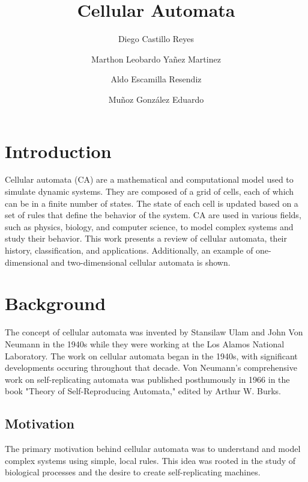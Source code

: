 \documentclass[9pt,a4paper,twoside]{tau-class/tau}
\title{Cellular Automata}
\author[a]{Diego Castillo Reyes}
\author[a]{Marthon Leobardo Yañez Martinez}
\author[a]{Aldo Escamilla Resendiz}
\author[a]{Muñoz González Eduardo}
\affil[a]{Researcher}
\begin{document}
		
    \maketitle 
    \thispagestyle{firststyle} \tauabstract
    \tableofcontents

\section{Introduction}

    Cellular automata (CA) are a mathematical and computational model used to simulate dynamic systems. 
        They are composed of a grid of cells, each of which can be in a finite number of states. 
        The state of each cell is updated based on a set of rules that define the behavior of the system. 
        CA are used in various fields, such as physics, biology, and computer science, to model complex systems and study their behavior. 
        This work presents a review of cellular automata, their history, classification, and applications. 
        Additionally, an example of one-dimensional and two-dimensional cellular automata is shown.

\section{Background}

    The concept of cellular automata was invented by Stansilaw Ulam and John Von Neumann in
    the 1940s while they were working at the Los Alamos National Laboratory.
    The work on cellular automata began in the 1940s, with significant developments occuring throughout
    that decade. Von Neumann’s comprehensive work on self-replicating automata was published 
    posthumously in 1966 in the book "Theory of Self-Reproducing Automata," edited by 
    Arthur W. Burks.

    \subsection{Motivation}
    The primary motivation behind cellular automata was to understand and model complex
    systems using simple, local rules. This idea was rooted in the study of biological 
    processes and the desire to create self-replicating machines.
\end{document}
